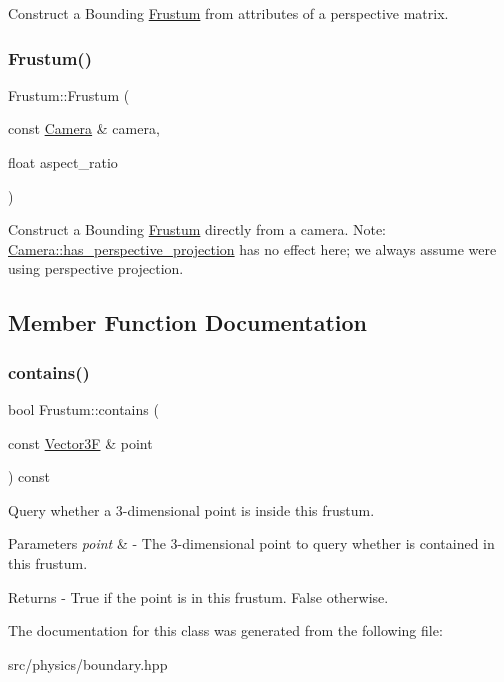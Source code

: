 Construct a Bounding \mbox{\hyperlink{class_frustum}{Frustum}} from attributes of a perspective matrix. \mbox{\label{class_frustum_a5ac3dd6a67b1a705570bbb113aa8b923}} 
\subsubsection{\texorpdfstring{Frustum()}{Frustum()}\hspace{0.1cm}{\footnotesize\ttfamily [2/2]}}
{\footnotesize\ttfamily Frustum\+::\+Frustum (\begin{DoxyParamCaption}\item[{const \mbox{\hyperlink{class_camera}{Camera}} \&}]{camera,  }\item[{float}]{aspect\+\_\+ratio }\end{DoxyParamCaption})}

Construct a Bounding \mbox{\hyperlink{class_frustum}{Frustum}} directly from a camera. Note\+: \mbox{\hyperlink{class_camera_a0faf690094effa7365ada339b6cb1751}{Camera\+::has\+\_\+perspective\+\_\+projection}} has no effect here; we always assume we\textquotesingle{}re using perspective projection. 

\subsection{Member Function Documentation}
\mbox{\label{class_frustum_a446362a4ddf7de9775eb13be131ec228}} 
\subsubsection{\texorpdfstring{contains()}{contains()}}
{\footnotesize\ttfamily bool Frustum\+::contains (\begin{DoxyParamCaption}\item[{const \mbox{\hyperlink{class_vector3}{Vector3F}} \&}]{point }\end{DoxyParamCaption}) const}

Query whether a 3-\/dimensional point is inside this frustum. 
\begin{DoxyParams}{Parameters}
{\em point} & -\/ The 3-\/dimensional point to query whether is contained in this frustum. \\
\hline
\end{DoxyParams}
\begin{DoxyReturn}{Returns}
-\/ True if the point is in this frustum. False otherwise. 
\end{DoxyReturn}


The documentation for this class was generated from the following file\+:\begin{DoxyCompactItemize}
\item 
src/physics/boundary.\+hpp\end{DoxyCompactItemize}

